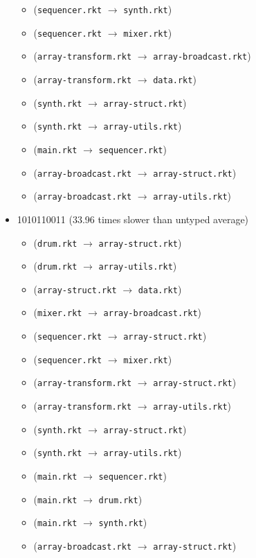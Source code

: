 \documentclass{article}
\newcommand{\mono}[1]{\texttt{#1}}
\begin{document}
\begin{itemize}
\begin{itemize}
  \item (\mono{sequencer.rkt} $\rightarrow$ \mono{synth.rkt})
  \item (\mono{sequencer.rkt} $\rightarrow$ \mono{mixer.rkt})
  \item (\mono{array-transform.rkt} $\rightarrow$ \mono{array-broadcast.rkt})
  \item (\mono{array-transform.rkt} $\rightarrow$ \mono{data.rkt})
  \item (\mono{synth.rkt} $\rightarrow$ \mono{array-struct.rkt})
  \item (\mono{synth.rkt} $\rightarrow$ \mono{array-utils.rkt})
  \item (\mono{main.rkt} $\rightarrow$ \mono{sequencer.rkt})
  \item (\mono{array-broadcast.rkt} $\rightarrow$ \mono{array-struct.rkt})
  \item (\mono{array-broadcast.rkt} $\rightarrow$ \mono{array-utils.rkt})
  \end{itemize}
\item 1010110011 (33.96 times slower than untyped average)
  \begin{itemize}
  \item (\mono{drum.rkt} $\rightarrow$ \mono{array-struct.rkt})
  \item (\mono{drum.rkt} $\rightarrow$ \mono{array-utils.rkt})
  \item (\mono{array-struct.rkt} $\rightarrow$ \mono{data.rkt})
  \item (\mono{mixer.rkt} $\rightarrow$ \mono{array-broadcast.rkt})
  \item (\mono{sequencer.rkt} $\rightarrow$ \mono{array-struct.rkt})
  \item (\mono{sequencer.rkt} $\rightarrow$ \mono{mixer.rkt})
  \item (\mono{array-transform.rkt} $\rightarrow$ \mono{array-struct.rkt})
  \item (\mono{array-transform.rkt} $\rightarrow$ \mono{array-utils.rkt})
  \item (\mono{synth.rkt} $\rightarrow$ \mono{array-struct.rkt})
  \item (\mono{synth.rkt} $\rightarrow$ \mono{array-utils.rkt})
  \item (\mono{main.rkt} $\rightarrow$ \mono{sequencer.rkt})
  \item (\mono{main.rkt} $\rightarrow$ \mono{drum.rkt})
  \item (\mono{main.rkt} $\rightarrow$ \mono{synth.rkt})
  \item (\mono{array-broadcast.rkt} $\rightarrow$ \mono{array-struct.rkt})

\end{itemize}
\end{itemize}
\end{document}
